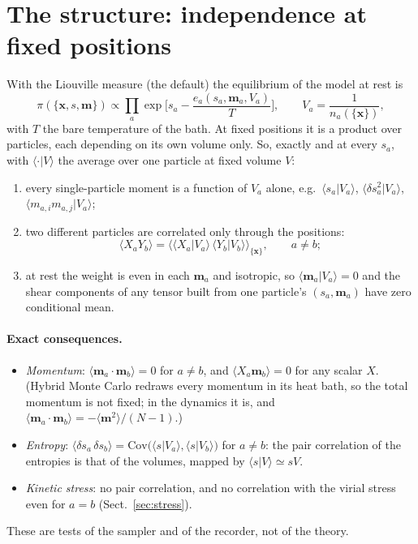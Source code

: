 \documentclass[11pt,aps,preprint,nofootinbib,superscriptaddress,tightenlines]{revtex4-2}
\newcommand{\avg}[1]{\langle #1\rangle}
\def\st{\begin{equation}}
\def\stp{\end{equation}}
\def\Sect#1{Sect.~\ref{#1}}
\let\oldparagraph\paragraph
\renewcommand{\paragraph}{\par\bigskip\oldparagraph}
\begin{document}
\section{The structure: independence at fixed positions}
\label{sec:structure}

With the Liouville measure (the default) the equilibrium of the model at rest is
\st
\pi(\{\bm x,s,\bm m\})\propto\prod_a\exp\Big[s_a-\frac{e_a(s_a,\bm m_a,V_a)}{T}\Big],\qquad V_a=\frac1{n_a(\{\bm x\})},
\label{joint}
\stp
with $T$ the bare temperature of the bath.  At fixed positions it is a product over particles, each depending on its own volume only.  So,
exactly and at every $s_a$, with $\avg{\cdot|V}$ the average over one particle at fixed volume $V$:
\begin{enumerate}
\item every single-particle moment is a function of $V_a$ alone, e.g.\ $\avg{s_a|V_a}$, $\avg{\delta s_a^2|V_a}$, $\avg{m_{a,i}m_{a,j}|V_a}$;
\item two different particles are correlated only through the positions:
  \st
  \avg{X_aY_b}=\Big\langle\avg{X_a|V_a}\,\avg{Y_b|V_b}\Big\rangle_{\{\bm x\}},\qquad a\neq b ;
  \stp
\item at rest the weight is even in each $\bm m_a$ and isotropic, so $\avg{\bm m_a|V_a}=0$ and the shear components of any tensor built from one
  particle's $(s_a,\bm m_a)$ have zero conditional mean.
\end{enumerate}

\paragraph{Exact consequences.}
\begin{itemize}
\item \emph{Momentum}: $\avg{\bm m_a\cdot\bm m_b}=0$ for $a\neq b$, and $\avg{X_a\bm m_b}=0$ for any scalar $X$.  (Hybrid Monte Carlo redraws every momentum
  in its heat bath, so the total momentum is not fixed; in the dynamics it is, and $\avg{\bm m_a\cdot\bm m_b}=-\avg{\bm m^2}/(N-1)$.)
\item \emph{Entropy}: $\avg{\delta s_a\,\delta s_b}=\mathrm{Cov}\big(\avg{s|V_a},\avg{s|V_b}\big)$ for $a\neq b$: the pair correlation of the entropies is that of the volumes,
  mapped by $\avg{s|V}\simeq sV$.
\item \emph{Kinetic stress}: no pair correlation, and no correlation with the virial stress even for $a=b$ (\Sect{sec:stress}).
\end{itemize}
These are tests of the sampler and of the recorder, not of the theory.
\end{document}
